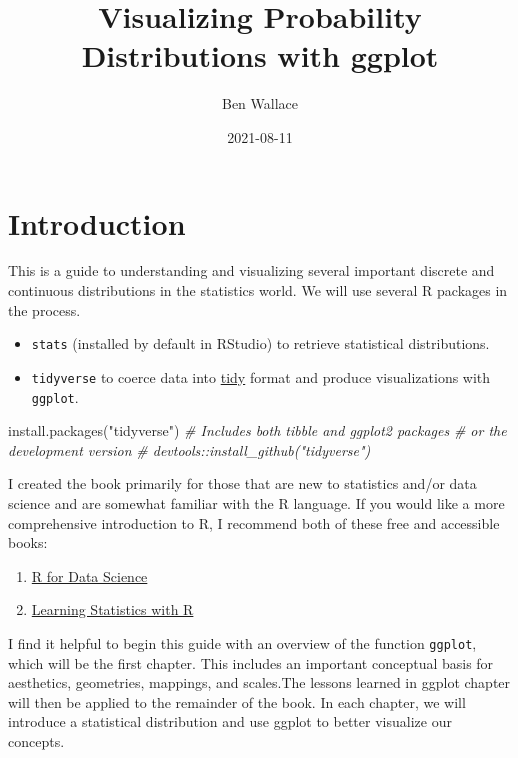\documentclass[
]{article}
\title{Visualizing Probability Distributions with ggplot}
\author{Ben Wallace}
\date{2021-08-11}
\newenvironment{Shaded}{\begin{snugshade}}{\end{snugshade}}
\newcommand{\CommentTok}[1]{\textcolor[rgb]{0.56,0.35,0.01}{\textit{#1}}}
\newcommand{\FunctionTok}[1]{\textcolor[rgb]{0.00,0.00,0.00}{#1}}
\newcommand{\NormalTok}[1]{#1}
\newcommand{\StringTok}[1]{\textcolor[rgb]{0.31,0.60,0.02}{#1}}
\begin{document}
\maketitle

{
\setcounter{tocdepth}{2}
\tableofcontents
}
\hypertarget{introduction}{%
\section{Introduction}\label{introduction}}

This is a guide to understanding and visualizing several important discrete and continuous distributions in the statistics world. We will use several R packages in the process.

\begin{itemize}
\item
  \texttt{stats} (installed by default in RStudio) to retrieve statistical distributions.
\item
  \texttt{tidyverse} to coerce data into \href{https://r4ds.had.co.nz/tibbles.html}{tidy} format and produce visualizations with \texttt{ggplot}.
\end{itemize}

\begin{Shaded}
\begin{Highlighting}[]
\FunctionTok{install.packages}\NormalTok{(}\StringTok{"tidyverse"}\NormalTok{) }\CommentTok{\# Includes both tibble and ggplot2 packages}
\CommentTok{\# or the development version}
\CommentTok{\# devtools::install\_github("tidyverse")}
\end{Highlighting}
\end{Shaded}

I created the book primarily for those that are new to statistics and/or data science and are somewhat familiar with the R language. If you would like a more comprehensive introduction to R, I recommend both of these free and accessible books:

\begin{enumerate}
\def\labelenumi{\arabic{enumi}.}
\item
  \href{https://r4ds.had.co.nz/}{R for Data Science}
\item
  \href{https://learningstatisticswithr.com/}{Learning Statistics with R}
\end{enumerate}

I find it helpful to begin this guide with an overview of the function \texttt{ggplot}, which will be the first chapter. This includes an important conceptual basis for aesthetics, geometries, mappings, and scales.The lessons learned in ggplot chapter will then be applied to the remainder of the book. In each chapter, we will introduce a statistical distribution and use ggplot to better visualize our concepts.
\end{document}
